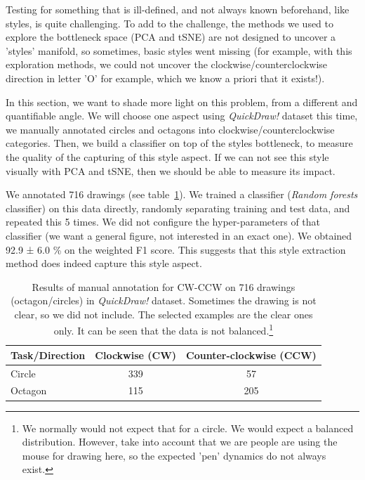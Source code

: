 \par Testing for something that is ill-defined, and not always known beforehand, like styles, is quite challenging. To add to the challenge, the methods we used to explore the bottleneck space (PCA and tSNE) are not designed to uncover a 'styles' manifold, so sometimes, basic styles went missing (for example, with this exploration methods, we could not uncover the clockwise/counterclockwise direction in letter 'O' for example, which we know a priori that it exists!).

\par In this section, we want to shade more light on this problem, from a different and quantifiable angle. We will choose one aspect using \textit{QuickDraw!} dataset this time, we manually annotated circles and octagons into clockwise/counterclockwise categories. Then, we build a classifier on top of the styles bottleneck, to measure the quality of the capturing of this style aspect. If we can not see this style visually with PCA and tSNE, then we should be able to measure its impact.

\par We annotated 716 drawings (see table~\ref{table:cw_ccw_annotation}). We trained a classifier (\textit{Random forests} classifier) on this data directly, randomly separating training and test data, and repeated this 5 times. We did not configure the hyper-parameters of that classifier (we want a general figure, not interested in an exact one). We obtained 92.9 ± 6.0 \% on the weighted F1 score. This suggests that this style extraction method does indeed capture this style aspect.

\begin{table}[!htbp]
  \centering
  \begin{tabular}{l c c}
  \hline
  Task/Direction & Clockwise (CW) & Counter-clockwise (CCW)\\ \hline
  Circle &  339 & 57 \\ %
  Octagon & 115 & 205 \\ \hline
  \end{tabular}
  \caption{Results of manual annotation for CW-CCW on 716 drawings (octagon/circles) in \textit{QuickDraw!} dataset. Sometimes the drawing is not clear, so we did not include. The selected examples are the clear ones only. It can be seen that the data is not balanced.\footnote{We normally would not expect that for a circle. We would expect a balanced distribution. However, take into account that we are people are using the mouse for drawing here, so the expected 'pen' dynamics do not always exist.}}
  \label{table:cw_ccw_annotation}
\end{table}


